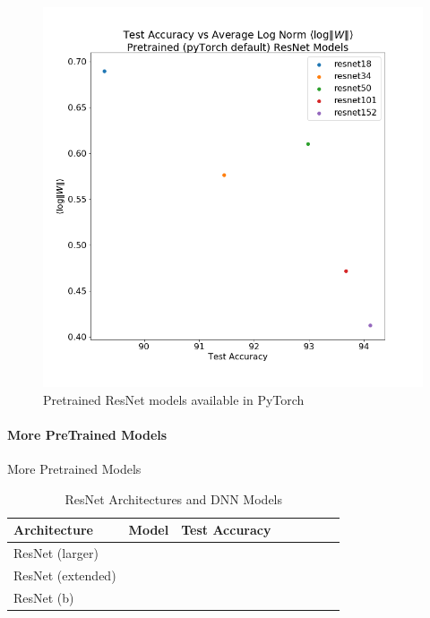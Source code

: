 \begin{figure}[!htb]
 \centering
   \includegraphics[scale=0.40]{img/resnet-pytorch.png}
   \caption{
Pretrained ResNet models available in PyTorch
}
  \label{fig:resnet}
\end{figure}



\paragraph{More PreTrained Models}

More Pretrained Models


\begin{table}[t]
\small
\begin{center}
\begin{tabular}{|p{1in}|c|c|c|c|c|c|c|}
\hline
Architecture 
 & Model
 & Test Accuracy \\
\hline
ResNet (larger) & & \\
\hline
ResNet (extended) & & \\
\hline
ResNet (b) & & \\
\hline
\end{tabular}
\end{center}
\caption{ResNet Architectures and DNN Models}
\label{table:models}
\end{table}




